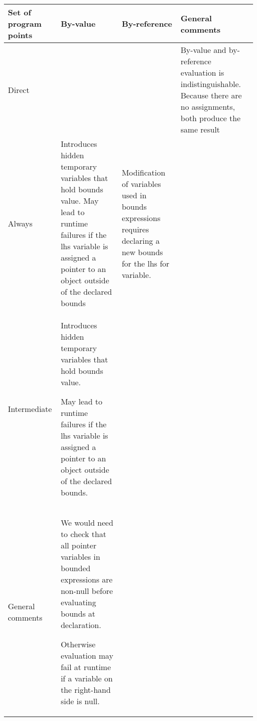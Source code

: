 \begin{longtable}[c]{@{}llll@{}}
\toprule
Set of program points & By-value & By-reference & General
comments\tabularnewline
\midrule
\endhead
Direct & & & By-value and by-reference evaluation is indistinguishable.
Because there are no assignments, both produce the same
result\tabularnewline
Always & Introduces hidden temporary variables that hold bounds value.
May lead to runtime failures if the lhs variable is assigned a pointer
to an object outside of the declared bounds & Modification of variables
used in bounds expressions requires declaring a new bounds for the lhs
for variable. &\tabularnewline
Intermediate & Introduces hidden temporary variables that hold bounds
value.

May lead to runtime failures if the lhs variable is assigned a pointer
to an object outside of the declared bounds. & &\tabularnewline
General comments & We would need to check that all pointer variables in
bounded expressions are non-null before evaluating bounds at
declaration.

Otherwise evaluation may fail at runtime if a variable on the right-hand
side is null. & &\tabularnewline
\bottomrule
\end{longtable}
